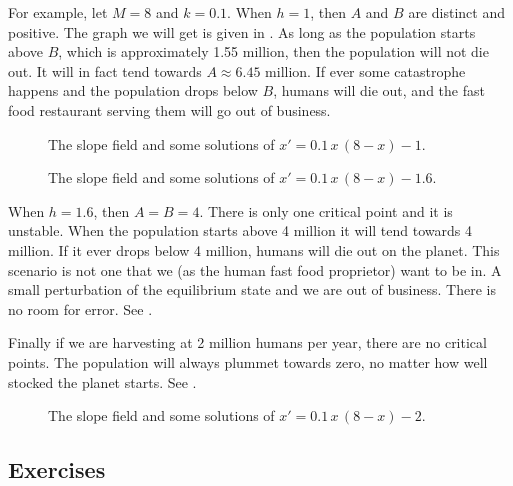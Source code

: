 \documentclass[12pt]{book}
\begin{document}
For example, let $M=8$ and $k=0.1$.
When $h=1$, then $A$ and $B$ are distinct and positive.
The graph we will get is given in .  As long as 
the population starts above $B$, which is approximately 1.55 million, then
the population will not die out.  It will in fact tend towards $A \approx
6.45$ million.  If ever some catastrophe happens and
the population drops below $B$,
humans will die out, and the fast food restaurant serving them will go out
of business.

\begin{figure}[h!t]
\begin{center}
\parbox[t]{3.1in}{
 \capstart
 \caption{The slope field and some solutions of
 $x' = 0.1\,x\,(8-x)-1$.\label{2.2:harv1}}
}
\quad
\parbox[t]{3.1in}{
 \capstart
 \caption{The slope field and some solutions of
 $x' = 0.1\,x\,(8-x)-1.6$.\label{2.2:harvc}}
}
\end{center}
\end{figure}

When $h = 1.6$, then $A=B=4$.  There is only one critical point and it is
unstable.  When the population starts above 4 million it will tend towards
4 million.  If it ever drops below 4 million, humans will die out on the
planet.  This scenario is not one that we (as the human fast food proprietor) 
want to be in.  A small perturbation of the equilibrium state and we are out
of business.  There is no room for error.  See .

Finally if we are harvesting at 2 million humans per year, there are no
critical points.
The population
will always plummet towards zero, no matter how well stocked the planet
starts.  See .

\begin{figure}[h!t]
\capstart
\begin{center}
\caption{The slope field and some solutions of
$x' = 0.1\,x\,(8-x)-2$.\label{2.2:harv2}}
\end{center}
\end{figure}


\subsection{Exercises}
\end{document}
